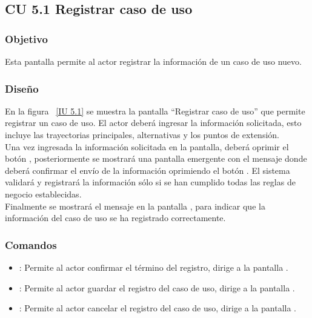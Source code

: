 \subsection{CU 5.1 Registrar caso de uso}

\subsubsection{Objetivo}
	
	Esta pantalla permite al actor registrar la información de un caso de uso nuevo.

\subsubsection{Diseño}

    En la figura ~\ref{IU 5.1} se muestra la pantalla ``Registrar caso de uso'' que permite registrar un caso de uso. El actor deberá ingresar la información solicitada, 
    esto incluye las trayectorias principales, alternativas y los puntos de extensión.\\
    
    
    Una vez ingresada la información solicitada en la pantalla, deberá oprimir el botón 
    , posteriormente se mostrará una pantalla emergente 
    con el mensaje  donde deberá confirmar el envío de la información oprimiendo el botón . 
    El sistema validará y registrará la información sólo si se han cumplido todas las reglas de negocio establecidas.  \\
    
    Finalmente se mostrará el mensaje  en la pantalla , para indicar que la información del caso de uso
    se ha registrado correctamente.        




\subsubsection{Comandos}
\begin{itemize}
	\item {}: Permite al actor confirmar el término del registro, dirige a la pantalla .
	\item {}: Permite al actor guardar el registro del caso de uso, dirige a la pantalla .
	\item {}: Permite al actor cancelar el registro del caso de uso, dirige a la pantalla .
\end{itemize}

